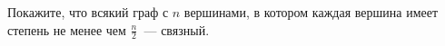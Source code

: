 Покажите, что всякий граф с $n$ вершинами, в котором каждая вершина имеет степень не менее чем
$\frac{n}{2}$~--- связный.
